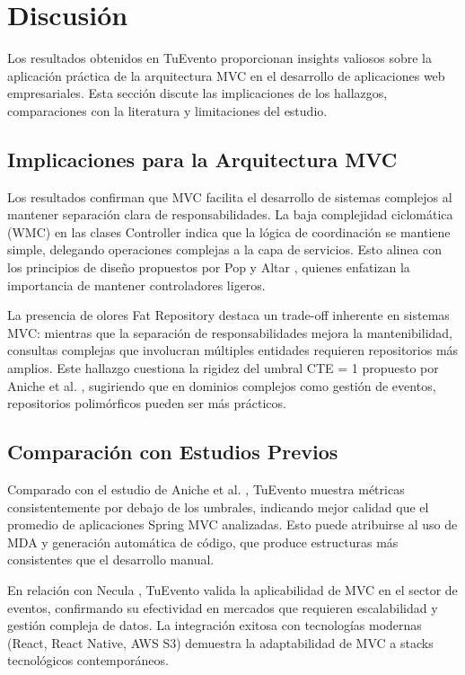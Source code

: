 \section{Discusión}

Los resultados obtenidos en TuEvento proporcionan insights valiosos sobre la aplicación práctica de la arquitectura MVC en el desarrollo de aplicaciones web empresariales. Esta sección discute las implicaciones de los hallazgos, comparaciones con la literatura y limitaciones del estudio.

\subsection{Implicaciones para la Arquitectura MVC}
Los resultados confirman que MVC facilita el desarrollo de sistemas complejos al mantener separación clara de responsabilidades. La baja complejidad ciclomática (WMC) en las clases Controller indica que la lógica de coordinación se mantiene simple, delegando operaciones complejas a la capa de servicios. Esto alinea con los principios de diseño propuestos por Pop y Altar \cite{pop2014designing}, quienes enfatizan la importancia de mantener controladores ligeros.

La presencia de olores Fat Repository destaca un trade-off inherente en sistemas MVC: mientras que la separación de responsabilidades mejora la mantenibilidad, consultas complejas que involucran múltiples entidades requieren repositorios más amplios. Este hallazgo cuestiona la rigidez del umbral CTE = 1 propuesto por Aniche et al. \cite{aniche2018code}, sugiriendo que en dominios complejos como gestión de eventos, repositorios polimórficos pueden ser más prácticos.

\subsection{Comparación con Estudios Previos}
Comparado con el estudio de Aniche et al. \cite{aniche2016satt}, TuEvento muestra métricas consistentemente por debajo de los umbrales, indicando mejor calidad que el promedio de aplicaciones Spring MVC analizadas. Esto puede atribuirse al uso de MDA y generación automática de código, que produce estructuras más consistentes que el desarrollo manual.

En relación con Necula \cite{necula2024exploring}, TuEvento valida la aplicabilidad de MVC en el sector de eventos, confirmando su efectividad en mercados que requieren escalabilidad y gestión compleja de datos. La integración exitosa con tecnologías modernas (React, React Native, AWS S3) demuestra la adaptabilidad de MVC a stacks tecnológicos contemporáneos.

